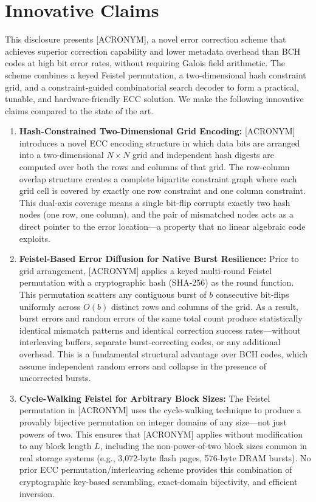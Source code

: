 \section*{Innovative Claims}
\noindent This disclosure presents [ACRONYM], a novel error correction scheme that achieves superior correction capability and lower metadata overhead than BCH codes at high bit error rates, without requiring Galois field arithmetic. The scheme combines a keyed Feistel permutation, a two-dimensional hash constraint grid, and a constraint-guided combinatorial search decoder to form a practical, tunable, and hardware-friendly ECC solution. We make the following innovative claims compared to the state of the art.

\begin{enumerate}

    \item \textbf{Hash-Constrained Two-Dimensional Grid Encoding:} [ACRONYM] introduces a novel ECC encoding structure in which data bits are arranged into a two-dimensional $N \times N$ grid and independent hash digests are computed over both the rows and columns of that grid. The row-column overlap structure creates a complete bipartite constraint graph where each grid cell is covered by exactly one row constraint and one column constraint. This dual-axis coverage means a single bit-flip corrupts exactly two hash nodes (one row, one column), and the pair of mismatched nodes acts as a direct pointer to the error location---a property that no linear algebraic code exploits.

    \item \textbf{Feistel-Based Error Diffusion for Native Burst Resilience:} Prior to grid arrangement, [ACRONYM] applies a keyed multi-round Feistel permutation with a cryptographic hash (SHA-256) as the round function. This permutation scatters any contiguous burst of $b$ consecutive bit-flips uniformly across $O(b)$ distinct rows and columns of the grid. As a result, burst errors and random errors of the same total count produce statistically identical mismatch patterns and identical correction success rates---without interleaving buffers, separate burst-correcting codes, or any additional overhead. This is a fundamental structural advantage over BCH codes, which assume independent random errors and collapse in the presence of uncorrected bursts.

    \item \textbf{Cycle-Walking Feistel for Arbitrary Block Sizes:} The Feistel permutation in [ACRONYM] uses the cycle-walking technique to produce a provably bijective permutation on integer domains of any size---not just powers of two. This ensures that [ACRONYM] applies without modification to any block length $L$, including the non-power-of-two block sizes common in real storage systems (e.g., 3,072-byte flash pages, 576-byte DRAM bursts). No prior ECC permutation/interleaving scheme provides this combination of cryptographic key-based scrambling, exact-domain bijectivity, and efficient inversion.


\end{enumerate}
